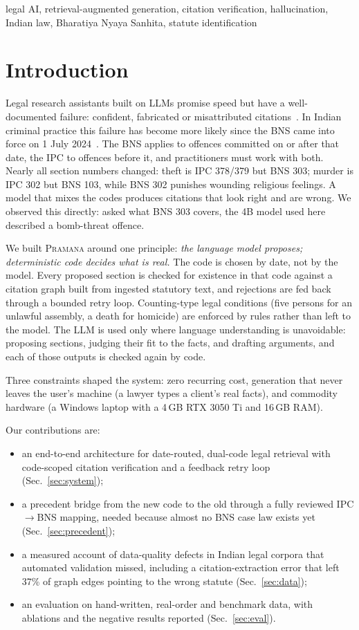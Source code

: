\documentclass[conference]{IEEEtran}
\newcommand{\sys}{\textsc{Pramana}\xspace}
\begin{document}
\begin{IEEEkeywords}
legal AI, retrieval-augmented generation, citation verification, hallucination, Indian law, Bharatiya Nyaya Sanhita, statute identification
\end{IEEEkeywords}

\section{Introduction}
Legal research assistants built on LLMs promise speed but have a well-documented failure: confident, fabricated or misattributed citations~\cite{dahl2024,magesh2024}. In Indian criminal practice this failure has become more likely since the BNS came into force on 1 July 2024~\cite{bns2023}. The BNS applies to offences committed on or after that date, the IPC to offences before it, and practitioners must work with both. Nearly all section numbers changed: theft is IPC 378/379 but BNS 303; murder is IPC 302 but BNS 103, while BNS 302 punishes wounding religious feelings. A model that mixes the codes produces citations that look right and are wrong. We observed this directly: asked what BNS 303 covers, the 4B model used here described a bomb-threat offence.

We built \sys around one principle: \emph{the language model proposes; deterministic code decides what is real.} The code is chosen by date, not by the model. Every proposed section is checked for existence in that code against a citation graph built from ingested statutory text, and rejections are fed back through a bounded retry loop. Counting-type legal conditions (five persons for an unlawful assembly, a death for homicide) are enforced by rules rather than left to the model. The LLM is used only where language understanding is unavoidable: proposing sections, judging their fit to the facts, and drafting arguments, and each of those outputs is checked again by code.

Three constraints shaped the system: zero recurring cost, generation that never leaves the user's machine (a lawyer types a client's real facts), and commodity hardware (a Windows laptop with a 4\,GB RTX 3050 Ti and 16\,GB RAM).

Our contributions are:
\begin{itemize}
\item an end-to-end architecture for date-routed, dual-code legal retrieval with code-scoped citation verification and a feedback retry loop (Sec.~\ref{sec:system});
\item a precedent bridge from the new code to the old through a fully reviewed IPC$\rightarrow$BNS mapping, needed because almost no BNS case law exists yet (Sec.~\ref{sec:precedent});
\item a measured account of data-quality defects in Indian legal corpora that automated validation missed, including a citation-extraction error that left 37\% of graph edges pointing to the wrong statute (Sec.~\ref{sec:data});
\item an evaluation on hand-written, real-order and benchmark data, with ablations and the negative results reported (Sec.~\ref{sec:eval}).
\end{itemize}
\end{document}
